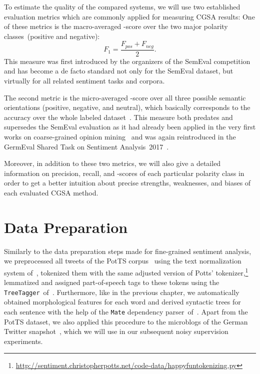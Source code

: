 To estimate the quality of the compared systems, we will use two
established evaluation metrics which are commonly applied for
measuring CGSA results: One of these metrics is the macro-averaged
\F-score over the two major polarity classes~(positive and negative):
{ \small%
  \begin{equation*}
    F_1 = \frac{F_{pos} + F_{neg}}{2}.
  \end{equation*}%
  \normalsize%
}%
This measure was first introduced by the organizers of the SemEval
competition~\cite{Nakov:13,Rosenthal:14,Rosenthal:15} and has become a
de facto standard not only for the SemEval dataset, but virtually for
all related sentiment tasks and corpora.

The second metric is the micro-averaged \F-score over all three
possible semantic orientations (positive, negative, and neutral),
which basically corresponds to the accuracy over the whole labeled
dataset~\cite[cf.][p.~577]{Manning:99}.  This measure both predates
and supersedes the SemEval evaluation as it had already been applied
in the very first works on coarse-grained opinion
mining~\cite{Wiebe:99,Das:01,Read:05,Kennedy:06,Go:09} and was again
reintroduced in the GermEval Shared Task on Sentiment
Analysis~2017~\cite{Biemann:17}.

Moreover, in addition to these two metrics, we will also give a
detailed information on precision, recall, and \F-scores of each
particular polarity class in order to get a better intuition about
precise strengths, weaknesses, and biases of each evaluated CGSA
method.

\section{Data Preparation}\label{sec:cgsa:data}

Similarly to the data preparation steps made for fine-grained
sentiment analysis, we preprocessed all tweets of the PotTS
corpus~\cite{Sidarenka:16} using the text normalization system
of~\citet{Sidarenka:13}, tokenized them with the same adjusted version
of Potts'
tokenizer,\footnote{\url{http://sentiment.christopherpotts.net/code-data/happyfuntokenizing.py}}
lemmatized and assigned part-of-speech tags to these tokens using the
\texttt{TreeTagger}~of~\citet{Schmid:95}.  Furthermore, like in the
previous chapter, we automatically obtained morphological features for
each word and derived syntactic trees for each sentence with the help
of the \texttt{Mate} dependency parser~of~\citet{Bohnet:13}. Apart
from the PotTS dataset, we also applied this procedure to the
microblogs of the German Twitter snapshot~\cite{Scheffler:14}, which
we will use in our subsequent noisy supervision experiments.

